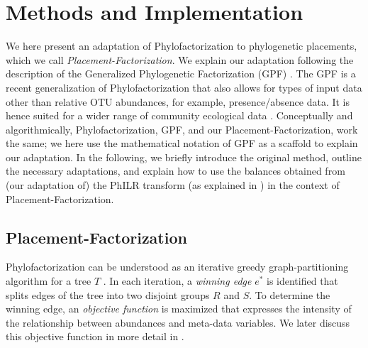 \section{Methods and Implementation}
\label{ch:Factorization:sec:Methods}

We here present an adaptation of Phylofactorization to phylogenetic placements, which we call \emph{Placement-Factorization}.
We explain our adaptation following the description of the Generalized Phylogenetic Factorization (GPF) \cite{Washburne2018,Washburne2019}.
The GPF is a recent generalization of Phylofactorization
that also allows for types of input data other than relative OTU abundances, for example, presence/absence data.
It is hence suited for a wider range of community ecological data \cite{Washburne2019}.
Conceptually and algorithmically, Phylofactorization, GPF, and our Placement-Factorization, work the same;
we here use the mathematical notation of GPF as a scaffold to explain our adaptation.
In the following, we briefly introduce the original method, outline the necessary adaptations,
and explain how to use the balances obtained from (our adaptation of)
the PhILR transform (as explained in ) in the context of Placement-Factorization.


\subsection{Placement-Factorization}
\label{ch:Factorization:sec:Methods:sub:Phylofactor}

Phylofactorization can be understood as an iterative greedy graph-partitioning algorithm for a tree $T$ \cite{Washburne2018}.
In each iteration, a \emph{winning edge} $e^*$ is identified
that splits edges of the tree into two disjoint groups $R$ and $S$.
To determine the winning edge, an \emph{objective function} is maximized
that expresses the intensity of the relationship between abundances and meta-data variables.
We later discuss this objective function in more detail in .


